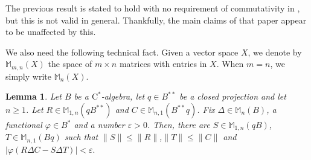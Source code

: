 \documentclass[10pt]{amsart}
\newcommand{\bM}{{\mathbb{M}}}
\newcommand{\rC}{\mathrm{C}}
\newcommand{\eps}{\varepsilon}
\renewcommand{\phi}{\varphi}
\newtheorem{lemma}{Lemma}[section]
\theoremstyle{definition}
\begin{document}
The previous result is stated to hold with no requirement of commutativity in \cite{hay2007}, but this  is not valid in general. 
Thankfully, the main claims of that paper appear to be unaffected by this.



We also need the following technical fact. Given a vector space $X$, we denote by $\bM_{m,n}(X)$ the space of $m\times n$ matrices with entries in $X$. When $m=n$, we simply write $\bM_n(X)$. 


\begin{lemma}\label{L:duality}
Let $B$ be a $\rC^*$-algebra, let $q\in B^{**}$ be a closed projection and let $n\geq 1$. Let $R\in \bM_{1,n}(qB^{**})$ and $C\in \bM_{n,1}(B^{**}q)$. Fix $\Delta \in \bM_n(B)$, a functional $\phi\in B^*$ and a number $\eps>0$. Then, there are  $S \in \bM_{1,n}(qB)$, $T\in \bM_{n,1}(Bq)$ such that $\|S\|\leq \|R\|$,$ \|T\|\leq \|C\|$ and 
$
| \phi(R\Delta C-S\Delta T)|<\eps.
$
\end{lemma}
\end{document}
